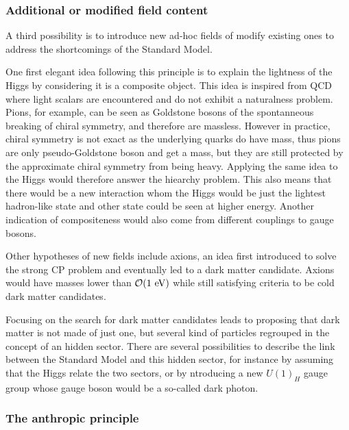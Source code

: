             \subsubsection{Additional or modified field content}

        A third possibility is to introduce new ad-hoc fields of modify existing ones
        to address the shortcomings of the Standard Model.

        One first elegant idea following this principle is to explain the lightness of the
        Higgs by considering it is a composite object. This idea is inspired from QCD where
        light scalars are encountered and do not exhibit a naturalness problem. Pions,
        for example, can be seen as Goldstone bosons of the spontanneous breaking of chiral
        symmetry, and therefore are massless. However in practice, chiral symmetry is not exact as
        the underlying quarks do have mass, thus pions are only pseudo-Goldstone boson and get a mass,
        but they are still protected by the approximate chiral symmetry from being heavy.
        Applying the same idea to the Higgs would therefore answer the hiearchy problem.
        This also means that there would be a new interaction whom the Higgs would
        be just the lightest hadron-like state and other state could be seen at higher
        energy. Another indication of compositeness would also come from different couplings
        to gauge bosons.

        Other hypotheses of new fields include axions, an idea first introduced to solve
        the strong CP problem and eventually led to a dark matter candidate. Axions would
        have masses lower than $\mathcal{O}(1~\text{eV})$ while still satisfying criteria to
        be cold dark matter candidates.

        Focusing on the search for dark matter candidates leads to proposing that dark matter
        is not made of just one, but several kind of particles regrouped in the concept
        of an hidden sector. There are several possibilities to describe the link between
        the Standard Model and this hidden sector, for instance by assuming that the Higgs
        relate the two sectors, or by ntroducing a new
        $U(1)_H$ gauge group whose gauge boson would be a so-called dark photon.

            \subsubsection{The anthropic principle}

